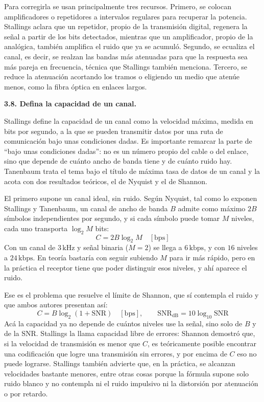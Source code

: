 \documentclass[11pt,a4paper]{article}
\begin{document}
Para corregirla se usan principalmente tres recursos. Primero, se colocan amplificadores o repetidores a intervalos regulares para recuperar la potencia. Stallings aclara que un repetidor, propio de la transmisión digital, regenera la señal a partir de los bits detectados, mientras que un amplificador, propio de la analógica, también amplifica el ruido que ya se acumuló. Segundo, se ecualiza el canal, es decir, se realzan las bandas más atenuadas para que la respuesta sea más pareja en frecuencia, técnica que Stallings también menciona. Tercero, se reduce la atenuación acortando los tramos o eligiendo un medio que atenúe menos, como la fibra óptica en enlaces largos.

\vspace{0.3cm}
\noindent\textbf{3.8. Defina la capacidad de un canal.}\par
Stallings define la capacidad de un canal como la velocidad máxima, medida en bits por segundo, a la que se pueden transmitir datos por una ruta de comunicación bajo unas condiciones dadas. Es importante remarcar la parte de ``bajo unas condiciones dadas'': no es un número propio del cable o del enlace, sino que depende de cuánto ancho de banda tiene y de cuánto ruido hay. Tanenbaum trata el tema bajo el título de máxima tasa de datos de un canal y la acota con dos resultados teóricos, el de Nyquist y el de Shannon.

El primero supone un canal ideal, sin ruido. Según Nyquist, tal como lo exponen Stallings y Tanenbaum, un canal de ancho de banda $B$ admite como máximo $2B$ símbolos independientes por segundo, y si cada símbolo puede tomar $M$ niveles, cada uno transporta $\log_2 M$ bits:
\[
  C = 2B\log_2 M \quad [\mathrm{bps}]
\]
Con un canal de $3\,\mathrm{kHz}$ y señal binaria ($M=2$) se llega a $6\,\mathrm{kbps}$, y con $16$ niveles a $24\,\mathrm{kbps}$. En teoría bastaría con seguir subiendo $M$ para ir más rápido, pero en la práctica el receptor tiene que poder distinguir esos niveles, y ahí aparece el ruido.

Ese es el problema que resuelve el límite de Shannon, que sí contempla el ruido y que ambos autores presentan así:
\[
  C = B\log_2\!\left(1+\mathrm{SNR}\right) \quad [\mathrm{bps}],
  \qquad \mathrm{SNR}_{\mathrm{dB}} = 10\log_{10}\mathrm{SNR}
\]
Acá la capacidad ya no depende de cuántos niveles use la señal, sino solo de $B$ y de la SNR. Stallings la llama capacidad libre de errores: Shannon demostró que, si la velocidad de transmisión es menor que $C$, es teóricamente posible encontrar una codificación que logre una transmisión sin errores, y por encima de $C$ eso no puede lograrse. Stallings también advierte que, en la práctica, se alcanzan velocidades bastante menores, entre otras cosas porque la fórmula supone solo ruido blanco y no contempla ni el ruido impulsivo ni la distorsión por atenuación o por retardo.
\end{document}
